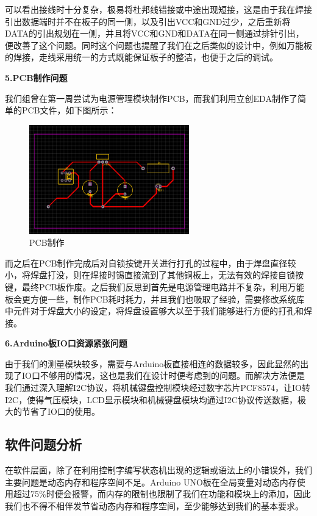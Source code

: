 \documentclass[a4paper, 11pt]{article} %
\begin{document}
\par{} 可以看出接线时十分复杂，极易将杜邦线错接或中途出现短接，这是由于我在焊接引出数据端时并不在板子的同一侧，以及引出VCC和GND过少，之后重新将DATA的引出规划在一侧，并且将VCC和GND和DATA在同一侧通过排针引出，便改善了这个问题。同时这个问题也提醒了我们在之后类似的设计中，例如万能板的焊接，走线采用统一的方式既能保证板子的整洁，也便于之后的调试。
\par{} \textbf{5.PCB制作问题}
\par{} 我们组曾在第一周尝试为电源管理模块制作PCB，而我们利用立创EDA制作了简单的PCB文件，如下图所示：
\begin{figure}[H]
  \centering
  \includegraphics[width = 0.618\textwidth]{PCB.png}
  \caption{PCB制作}
\end{figure}
\par{} 而之后在PCB制作完成后对自锁按键开关进行打孔的过程中，由于焊盘直径较小，将焊盘打没，则在焊接时锡直接流到了其他铜板上，无法有效的焊接自锁按键，最终PCB板作废。之后我们反思到首先是电源管理电路并不复杂，利用万能板会更方便一些，制作PCB耗时耗力，并且我们也吸取了经验，需要修改系统库中元件对于焊盘大小的设定，将焊盘设置够大以至于我们能够进行方便的打孔和焊接。

\par{} \textbf{6.Arduino板IO口资源紧张问题}
\par{} 由于我们的测量模块较多，需要与Arduino板直接相连的数据较多，因此显然的出现了IO口不够用的情况，这也是我们在设计时便考虑到的问题。而解决方法便是我们通过深入理解I2C协议，将机械键盘控制模块经过数字芯片PCF8574，让IO转I2C，使得气压模块，LCD显示模块和机械键盘模块均通过I2C协议传送数据，极大的节省了IO口的使用。

\subsection{软件问题分析}
\par{} 在软件层面，除了在利用控制字编写状态机出现的逻辑或语法上的小错误外，我们主要问题是动态内存和程序空间不足。Arduino UNO板在全局变量对动态内存使用超过75\%时便会报警，而内存的限制也限制了我们在功能和模块上的添加，因此我们也不得不相伴发节省动态内存和程序空间，至少能够达到我们的基本要求。
\end{document}
